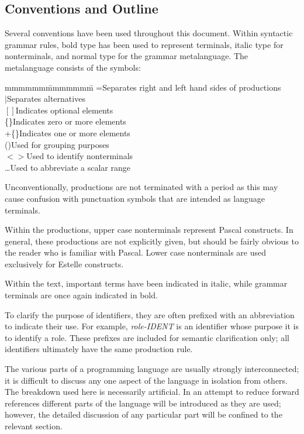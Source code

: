 \subsection[Conventions and Outline]{Conventions and Outline}
\label{conventions}
 
 Several conventions have been used throughout this
document. Within syntactic grammar rules, bold type has
been used to represent terminals, italic type for
nonterminals, and normal type for the grammar metalanguage.
The metalanguage consists of the symbols:

\begin{tabbing}
mmmmmm\=mmmmmmm\=\+\kill
=\>Separates right and left hand sides of productions\\
$|$\>Separates alternatives\\
$[]$\>Indicates optional elements\\
\{\}\>Indicates zero or more elements\\
+\{\}\>Indicates one or more elements\\
()\>Used for grouping purposes\\
$<>$\>Used to identify nonterminals\\
\dots\>Used to abbreviate a scalar range\\
\end{tabbing}

Unconventionally, productions are not terminated with a
period as this may cause confusion with punctuation symbols
that are intended as language terminals.
 
Within the productions, upper case nonterminals represent
Pascal constructs. In general, these productions are not
explicitly given, but should be fairly obvious to the reader
who is familiar with Pascal. Lower case nonterminals are
used exclusively for Estelle constructs.
 
Within the text, important terms have been indicated in
italic, while grammar terminals are once again indicated in
bold.
 
To clarify the purpose of identifiers, they are often
prefixed with an abbreviation to indicate their use. For
example, {\em role-IDENT} is an identifier whose purpose it is to
identify a role. These prefixes are included for semantic
clarification only; all identifiers ultimately have the same
production rule.

The various parts of a programming language are usually
strongly interconnected; it is difficult to discuss any one
aspect of the language in isolation from others. The
breakdown used here is necessarily artificial.
In an attempt to reduce forward references different parts
of the language will be introduced as they are used;
however, the detailed discussion of any particular part will
be confined to the relevant section.
 
